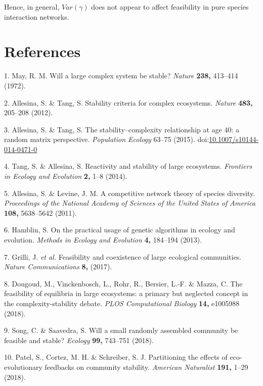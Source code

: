 \documentclass[]{article}
\begin{document}
Hence, in general, \(Var(\gamma)\) does not appear to affect feasibility
in pure species interaction networks.

\section*{References}\label{references}

\hypertarget{refs}{}
\hypertarget{ref-May1972}{}
1. May, R. M. Will a large complex system be stable? \emph{Nature}
\textbf{238,} 413--414 (1972).

\hypertarget{ref-Allesina2012}{}
2. Allesina, S. \& Tang, S. Stability criteria for complex ecosystems.
\emph{Nature} \textbf{483,} 205--208 (2012).

\hypertarget{ref-Allesina2015a}{}
3. Allesina, S. \& Tang, S. The stability--complexity relationship at
age 40: a random matrix perspective. \emph{Population Ecology} 63--75
(2015).
doi:\href{https://doi.org/10.1007/s10144-014-0471-0}{10.1007/s10144-014-0471-0}

\hypertarget{ref-Tang2014b}{}
4. Tang, S. \& Allesina, S. Reactivity and stability of large
ecosystems. \emph{Frontiers in Ecology and Evolution} \textbf{2,} 1--8
(2014).

\hypertarget{ref-Allesina2011}{}
5. Allesina, S. \& Levine, J. M. A competitive network theory of species
diversity. \emph{Proceedings of the National Academy of Sciences of the
United States of America} \textbf{108,} 5638--5642 (2011).

\hypertarget{ref-Hamblin2013}{}
6. Hamblin, S. On the practical usage of genetic algorithms in ecology
and evolution. \emph{Methods in Ecology and Evolution} \textbf{4,}
184--194 (2013).

\hypertarget{ref-Grilli2017}{}
7. Grilli, J. \emph{et al.} Feasibility and coexistence of large
ecological communities. \emph{Nature Communications} \textbf{8,} (2017).

\hypertarget{ref-Dougoud2018}{}
8. Dougoud, M., Vinckenbosch, L., Rohr, R., Bersier, L.-F. \& Mazza, C.
The feasibility of equilibria in large ecosystems: a primary but
neglected concept in the complexity-stability debate. \emph{PLOS
Computational Biology} \textbf{14,} e1005988 (2018).

\hypertarget{ref-Song2018}{}
9. Song, C. \& Saavedra, S. Will a small randomly assembled community be
feasible and stable? \emph{Ecology} \textbf{99,} 743--751 (2018).

\hypertarget{ref-Patel2018}{}
10. Patel, S., Cortez, M. H. \& Schreiber, S. J. Partitioning the
effects of eco-evolutionary feedbacks on community stability.
\emph{American Naturalist} \textbf{191,} 1--29 (2018).
\end{document}
